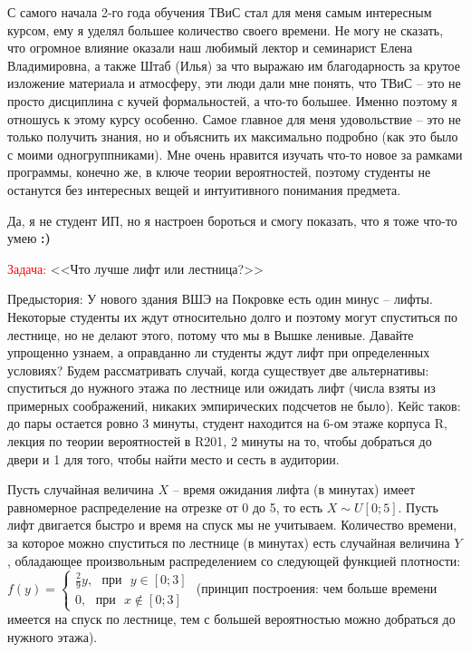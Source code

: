 \documentclass[a4paper,11pt]{article}
\begin{document}
	\begin{tcolorbox}[enhanced jigsaw,breakable,pad at break*=1mm, attach boxed title to top center={yshift=-3mm,yshifttext=-1mm},
	colback=blue!5!white,colframe=blue!100!black,colbacktitle=blue!100!black,
	title=Почему именно меня должны взять в ассисенты?,fonttitle=\bfseries,
	boxed title style={size=small,colframe=black!100!black}]
	С самого начала 2-го года обучения ТВиС стал для меня самым интересным курсом, ему я уделял большее количество своего времени. Не могу не сказать, что огромное влияние оказали наш любимый лектор и семинарист Елена Владимировна, а также Штаб (Илья) за что выражаю им благодарность за крутое изложение материала и атмосферу, эти люди дали мне понять, что ТВиС -- это не просто дисциплина с кучей формальностей, а что-то большее. Именно поэтому я отношусь к этому курсу особенно. Самое главное для меня удовольствие -- это не только получить знания, но и объяснить их максимально подробно (как это было с моими одногруппниками). Мне очень нравится изучать что-то новое за рамками программы, конечно же, в ключе теории вероятностей, поэтому студенты не останутся без интересных вещей и интуитивного понимания предмета.
	
	Да, я не студент ИП, но я настроен бороться и смогу показать, что я тоже что-то умею \textbf{:)}
	\end{tcolorbox}

	\newpage
	\begin{center}
		{\large \textcolor{red}{Задача:} <<Что лучше лифт или лестница?>>}
	\end{center}

	Предыстория: У нового здания ВШЭ на Покровке есть один минус -- лифты. Некоторые студенты их ждут относительно долго и поэтому могут спуститься по лестнице, но не делают этого, потому что мы в Вышке ленивые. Давайте упрощенно узнаем, а оправданно ли студенты ждут лифт при определенных условиях? Будем рассматривать случай, когда существует две альтернативы: спуститься до нужного этажа по лестнице или ожидать лифт (числа взяты из примерных соображений, никаких эмпирических подсчетов не было). Кейс таков: до пары остается ровно 3 минуты, студент находится на 6-ом этаже корпуса R, лекция по теории вероятностей в R201, 2 минуты на то, чтобы добраться до двери и 1 для того, чтобы найти место и сесть в аудитории.
	
	Пусть случайная величина $ X $ -- время ожидания лифта (в минутах) имеет равномерное распределение на отрезке от 0 до 5, то есть $ X \sim U[0;5] $. Пусть лифт двигается быстро и время на спуск мы не учитываем. Количество времени, за которое можно спуститься по лестнице (в минутах) есть случайная величина $ Y $, обладающее произвольным распределением со следующей функцией плотности: $ f(y) = \begin{cases}
	\frac{2}{9}y, \text{ } \text{при} \text{ } y\in[0;3] \\
	0, \text{ } \text{при} \text{ } x\notin[0;3]
	\end{cases} $ (принцип построения: чем больше времени имеется на спуск по лестнице, тем с большей вероятностью можно добраться до нужного этажа).
	
\end{document}
